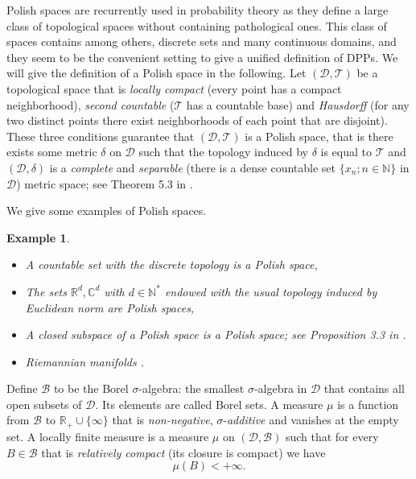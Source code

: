 \documentclass[twoside,11pt]{book}
\newtheorem{example}{Example}
\numberwithin{theorem}{chapter}
\numberwithin{definition}{chapter}
\numberwithin{proposition}{chapter}
\numberwithin{corollary}{chapter}
\numberwithin{example}{chapter}
\numberwithin{lemma}{chapter}
\numberwithin{assumption}{chapter}
\numberwithin{equation}{chapter}
\numberwithin{figure}{chapter}
\begin{document}
Polish spaces are recurrently used in probability theory as they define a large class of topological spaces without containing pathological ones. 
This class of spaces contains among others, discrete sets and many continuous domains, and they seem to be the convenient setting to give a unified definition of DPPs. We will give the definition of a Polish space in the following. Let $(\mathcal{D},\mathcal{T})$ be a topological space that is \emph{locally compact} (every point has a compact neighborhood), \emph{second countable} ($\mathcal{T}$ has a countable base) and \emph{Hausdorff} (for any two distinct points there exist neighborhoods of each point that are disjoint).
 These three conditions guarantee that $(\mathcal{D},\mathcal{T})$ is a Polish space, that is there exists some metric $\delta$ on $\mathcal{D}$ such that the
topology induced by $\delta$ is equal to $\mathcal{T}$ and $(\mathcal{D},\delta)$ is a \emph{complete} and \emph{separable} (there is a dense countable set $\{x_{n}; n \in \mathbb{N}\}$ in $\mathcal{D}$)
metric space; see Theorem 5.3 in \parencite{Kec95}.

We give some examples of Polish spaces. 
\begin{example}\leavevmode\newline
\begin{itemize}
\item A countable set with the discrete topology is a Polish space, 
\item The sets $\mathbb{R}^{d}, \mathbb{C}^{d}$ with $d \in \mathbb{N}^{*}$ endowed with the usual topology induced by Euclidean norm are Polish spaces,
\item A closed subspace of a Polish space is a Polish space; see Proposition 3.3 in \parencite{Kec95}.
\item Riemannian manifolds .

\end{itemize}
\end{example}

Define $\mathcal{B}$ to be the Borel $\sigma$-algebra: the smallest $\sigma$-algebra in $\mathcal{D}$ that contains all open subsets of $\mathcal{D}$. Its elements are called Borel sets. A measure $\mu$ is a function from $\mathcal{B}$ to $\mathbb{R}_{+} \cup \{\infty \}$ that is \emph{non-negative}, $\sigma$-\emph{additive} and vanishes at the empty set. A locally finite measure is a measure $\mu$ on $(\mathcal{D},\mathcal{B})$ such that for every  $B \in \mathcal{B}$ that is \emph{relatively compact} (its closure is compact) we have
\begin{equation}
\mu(B) <+\infty.
\end{equation}
\end{document}

